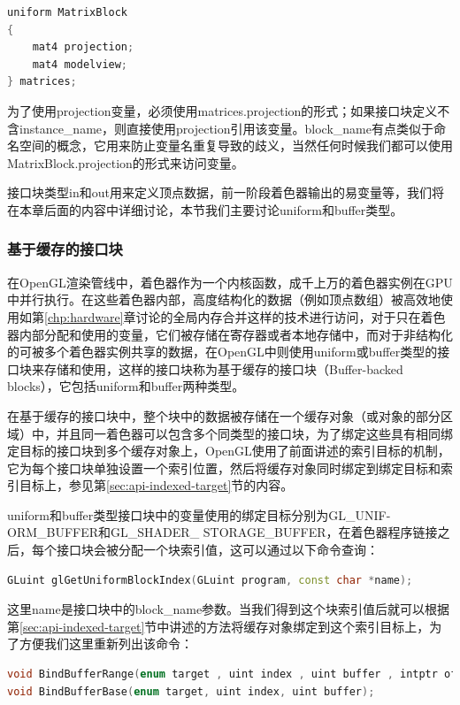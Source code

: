\begin{lstlisting}[language=C++]
uniform MatrixBlock
{
	mat4 projection;
	mat4 modelview;
} matrices;
\end{lstlisting}

为了使用projection变量，必须使用matrices.projection的形式；如果接口块定义不含instance\_name，则直接使用projection引用该变量。block\_name有点类似于命名空间的概念，它用来防止变量名重复导致的歧义，当然任何时候我们都可以使用MatrixBlock.projection的形式来访问变量。

接口块类型in和out用来定义顶点数据，前一阶段着色器输出的易变量等，我们将在本章后面的内容中详细讨论，本节我们主要讨论uniform和buffer类型。




\subsubsection{基于缓存的接口块}
在OpenGL渲染管线中，着色器作为一个内核函数，成千上万的着色器实例在GPU中并行执行。在这些着色器内部，高度结构化的数据（例如顶点数组）被高效地使用如第\ref{chp:hardware}章讨论的全局内存合并这样的技术进行访问，对于只在着色器内部分配和使用的变量，它们被存储在寄存器或者本地存储中，而对于非结构化的可被多个着色器实例共享的数据，在OpenGL中则使用uniform或buffer类型的接口块来存储和使用，这样的接口块称为基于缓存的接口块（Buffer-backed blocks），它包括uniform和buffer两种类型。

在基于缓存的接口块中，整个块中的数据被存储在一个缓存对象（或对象的部分区域）中，并且同一着色器可以包含多个同类型的接口块，为了绑定这些具有相同绑定目标的接口块到多个缓存对象上，OpenGL使用了前面讲述的索引目标的机制，它为每个接口块单独设置一个索引位置，然后将缓存对象同时绑定到绑定目标和索引目标上，参见第\ref{sec:api-indexed-target}节的内容。

uniform和buffer类型接口块中的变量使用的绑定目标分别为GL\_UNIF-\\ORM\_BUFFER和GL\_SHADER\_ STORAGE\_BUFFER，在着色器程序链接之后，每个接口块会被分配一个块索引值，这可以通过以下命令查询：

\begin{lstlisting}[language=C++]
GLuint glGetUniformBlockIndex​(GLuint program​​, const char *name​​);
\end{lstlisting}

这里name是接口块中的block\_name参数。当我们得到这个块索引值后就可以根据第\ref{sec:api-indexed-target}节中讲述的方法将缓存对象绑定到这个索引目标上，为了方便我们这里重新列出该命令：

\begin{lstlisting}[language=C++]
void BindBufferRange(enum target , uint index , uint buffer , intptr offset , sizeiptr size);
void BindBufferBase(enum target, uint index, uint buffer);
\end{lstlisting}

